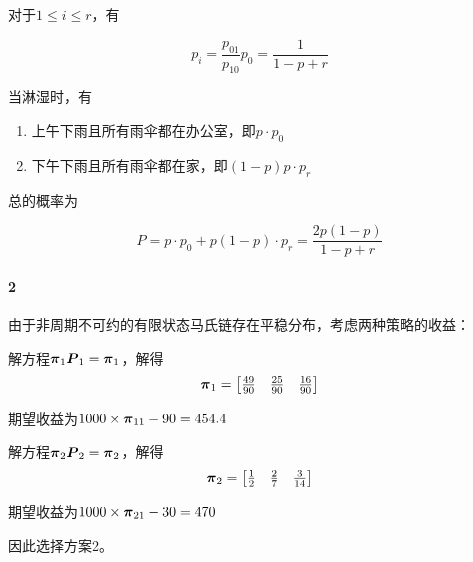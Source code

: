 \documentclass{../notes}
\begin{document}
\begin{subquestions}
        对于$1\leq i\leq r$，有

        \begin{equation}
            p_i = \frac{p_{01}}{p_{10}}p_0 = \frac{1}{1-p+r}
        \end{equation}

        \item 当淋湿时，有

        \begin{enumerate}
            \item 上午下雨且所有雨伞都在办公室，即$p\cdot p_0$
            \item 下午下雨且所有雨伞都在家，即$(1-p)p\cdot p_r$
        \end{enumerate}

        总的概率为

        \begin{equation}
            P = p\cdot p_0 + p(1-p)\cdot p_r = \frac{2p(1-p)}{1-p+r}
        \end{equation}
    \end{subquestions}

    \paragraph*{2} 由于非周期不可约的有限状态马氏链存在平稳分布，考虑两种策略的收益：

    \begin{subquestions}
        \item 解方程$\boldsymbol \pi_1\boldsymbol P_1 = \boldsymbol\pi_1$，解得
        \begin{equation}
            \boldsymbol \pi_1 = \begin{bmatrix}
                \frac{49}{90} & \frac{25}{90} & \frac{16}{90}
            \end{bmatrix}
        \end{equation}

        期望收益为$1000\times \boldsymbol\pi_{11} - 90 = 454.4$

        \item 解方程$\boldsymbol \pi_2\boldsymbol P_2 = \boldsymbol\pi_2$，解得
        \begin{equation}
            \boldsymbol \pi_2 = \begin{bmatrix}
                \frac{1}{2} & \frac{2}{7} & \frac{3}{14}
            \end{bmatrix}
        \end{equation}

        期望收益为$1000\times \boldsymbol\pi_{21} - 30 = 470$
    \end{subquestions}

    因此选择方案2。
\end{document}
